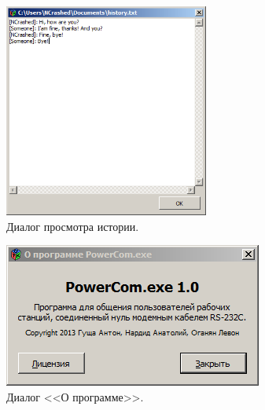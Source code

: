 \documentclass[russian,utf8,simple,emptystyle]{eskdtext}
\begin{document}
\begin{figure}[!h]
\centering
\includegraphics[width=0.6\textwidth]{history_view}
\caption{Диалог просмотра истории.}
\label{fig:history-view}
\end{figure}

\begin{figure}[!h]
\centering
\includegraphics[scale=1.0]{about_dialog}
\caption{Диалог <<О программе>>.}
\label{fig:about-dialog}
\end{figure}
\end{document}
